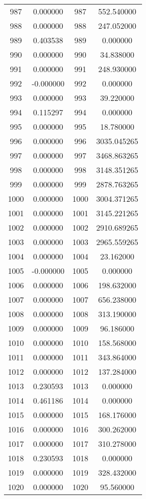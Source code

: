 \documentclass[12pt]{article}
\begin{document}
\begin{longtable}{@{}cccc@{}}
987 & 0.000000 & 987 & 552.540000 \\
988 & 0.000000 & 988 & 247.052000 \\
989 & 0.403538 & 989 & 0.000000 \\
990 & 0.000000 & 990 & 34.838000 \\
991 & 0.000000 & 991 & 248.930000 \\
992 & -0.000000 & 992 & 0.000000 \\
993 & 0.000000 & 993 & 39.220000 \\
994 & 0.115297 & 994 & 0.000000 \\
995 & 0.000000 & 995 & 18.780000 \\
996 & 0.000000 & 996 & 3035.045265 \\
997 & 0.000000 & 997 & 3468.863265 \\
998 & 0.000000 & 998 & 3148.351265 \\
999 & 0.000000 & 999 & 2878.763265 \\
1000 & 0.000000 & 1000 & 3004.371265 \\
1001 & 0.000000 & 1001 & 3145.221265 \\
1002 & 0.000000 & 1002 & 2910.689265 \\
1003 & 0.000000 & 1003 & 2965.559265 \\
1004 & 0.000000 & 1004 & 23.162000 \\
1005 & -0.000000 & 1005 & 0.000000 \\
1006 & 0.000000 & 1006 & 198.632000 \\
1007 & 0.000000 & 1007 & 656.238000 \\
1008 & 0.000000 & 1008 & 313.190000 \\
1009 & 0.000000 & 1009 & 96.186000 \\
1010 & 0.000000 & 1010 & 158.568000 \\
1011 & 0.000000 & 1011 & 343.864000 \\
1012 & 0.000000 & 1012 & 137.284000 \\
1013 & 0.230593 & 1013 & 0.000000 \\
1014 & 0.461186 & 1014 & 0.000000 \\
1015 & 0.000000 & 1015 & 168.176000 \\
1016 & 0.000000 & 1016 & 300.262000 \\
1017 & 0.000000 & 1017 & 310.278000 \\
1018 & 0.230593 & 1018 & 0.000000 \\
1019 & 0.000000 & 1019 & 328.432000 \\
1020 & 0.000000 & 1020 & 95.560000 \\

\end{longtable}
\end{document}
